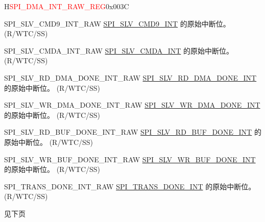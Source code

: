 \begin{register}{H}{\textcolor{red}{SPI\_DMA\_INT\_RAW\_REG}}{0x{}003C}
\begin{regdesc}
\begin{reglist}
\label{fielddesc:SPISLVCMD9INTRAW}\item [SPI\_SLV\_CMD9\_INT\_RAW] \hyperref[int:SPISLVCMD9INT]{SPI\_SLV\_CMD9\_INT} 的原始中断位。 (R/WTC/SS)
\label{fielddesc:SPISLVCMDAINTRAW}\item [SPI\_SLV\_CMDA\_INT\_RAW] \hyperref[int:SPISLVCMDAINT]{SPI\_SLV\_CMDA\_INT} 的原始中断位。 (R/WTC/SS)
\label{fielddesc:SPISLVRDDMADONEINTRAW}\item [SPI\_SLV\_RD\_DMA\_DONE\_INT\_RAW] \hyperref[int:SPISLVRDDMADONEINT]{SPI\_SLV\_RD\_DMA\_DONE\_INT} 的原始中断位。 (R/WTC/SS)
\label{fielddesc:SPISLVWRDMADONEINTRAW}\item [SPI\_SLV\_WR\_DMA\_DONE\_INT\_RAW] \hyperref[int:SPISLVWRDMADONEINT]{SPI\_SLV\_WR\_DMA\_DONE\_INT} 的原始中断位。 (R/WTC/SS)
\label{fielddesc:SPISLVRDBUFDONEINTRAW}\item [SPI\_SLV\_RD\_BUF\_DONE\_INT\_RAW] \hyperref[int:SPISLVRDBUFDONEINT]{SPI\_SLV\_RD\_BUF\_DONE\_INT} 的原始中断位。 (R/WTC/SS)
\label{fielddesc:SPISLVWRBUFDONEINTRAW}\item [SPI\_SLV\_WR\_BUF\_DONE\_INT\_RAW] \hyperref[int:SPISLVWRBUFDONEINT]{SPI\_SLV\_WR\_BUF\_DONE\_INT} 的原始中断位。 (R/WTC/SS)
\label{fielddesc:SPITRANSDONEINTRAW}\item [SPI\_TRANS\_DONE\_INT\_RAW] \hyperref[int:SPITRANSDONEINT]{SPI\_TRANS\_DONE\_INT} 的原始中断位。 (R/WTC/SS)

\item [见下页]
\end{reglist}\end{regdesc}
\end{register}

